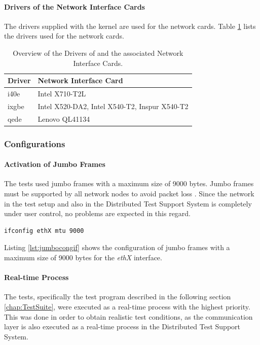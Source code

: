 \paragraph{Drivers of the Network Interface Cards}

The drivers supplied with the kernel are used for the network cards. Table \ref{tab:drivernic} lists the drivers used for the network cards.

\begin{table}[h]
\centering
\begin{tabular}{l|l}
	\toprule
	\textbf{Driver} & \textbf{Network Interface Card}\\
	\midrule
	i40e & Intel X710-T2L\\
	ixgbe & Intel X520-DA2, Intel X540-T2, Inspur X540-T2 \\
	qede & Lenovo QL41134\\
	\bottomrule
\end{tabular}
\caption{Overview of the Drivers of and the associated Network Interface Cards.}
\label{tab:drivernic}
\end{table}

\subsubsection{Configurations}

\paragraph{Activation of Jumbo Frames}

The tests used jumbo frames with a maximum size of 9000 bytes. Jumbo frames must be supported by all network nodes to avoid packet loss \cite{swsetup04}. Since the network in the test setup and also in the Distributed Test Support System is completely under user control, no problems are expected in this regard. \\

\begin{lstlisting}[language=Bash, caption=Configuration of Jumbo Frames for the ethX Interface., label=lst:jumbocongif]
ifconfig ethX mtu 9000
\end{lstlisting}

Listing \ref{lst:jumbocongif} shows the configuration of jumbo frames with a maximum size of 9000 bytes for the \textit{ethX} interface.


\paragraph{Real-time Process} \label{chap:RTProcess}
The tests, specifically the test program described in the following section \ref{chap:TestSuite}, were executed as a real-time process with the highest priority. This was done in order to obtain realistic test conditions, as the communication layer is also executed as a real-time process in the Distributed Test Support System. \\

